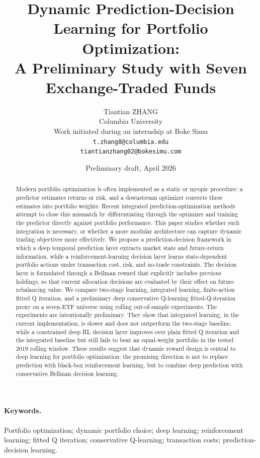 \documentclass[11pt]{article}
\title{Dynamic Prediction-Decision Learning for Portfolio Optimization:\\
A Preliminary Study with Seven Exchange-Traded Funds}
\author{
Tiantian ZHANG\\
Columbia University\\
Work initiated during an internship at Boke Simu\\
\texttt{t.zhang8@columbia.edu}\\
\texttt{tiantianzhang02@bokesimu.com}
}
\date{Preliminary draft, April 2026}
\begin{document}
\maketitle

\begin{abstract}
Modern portfolio optimization is often implemented as a static or myopic procedure: a predictor estimates returns or risk, and a downstream optimizer converts these estimates into portfolio weights. Recent integrated prediction-optimization methods attempt to close this mismatch by differentiating through the optimizer and training the predictor directly against portfolio performance. This paper studies whether such integration is necessary, or whether a more modular architecture can capture dynamic trading objectives more effectively. We propose a prediction-decision framework in which a deep temporal prediction layer extracts market state and future-return information, while a reinforcement-learning decision layer learns state-dependent portfolio actions under transaction cost, risk, and no-trade constraints. The decision layer is formulated through a Bellman reward that explicitly includes previous holdings, so that current allocation decisions are evaluated by their effect on future rebalancing value. We compare two-stage learning, integrated learning, finite-action fitted Q iteration, and a preliminary deep conservative Q-learning fitted-Q-iteration proxy on a seven-ETF universe using rolling out-of-sample experiments. The experiments are intentionally preliminary. They show that integrated learning, in the current implementation, is slower and does not outperform the two-stage baseline, while a constrained deep RL decision layer improves over plain fitted Q iteration and the integrated baseline but still fails to beat an equal-weight portfolio in the tested 2019 rolling window. These results suggest that dynamic reward design is central to deep learning for portfolio optimization: the promising direction is not to replace prediction with black-box reinforcement learning, but to combine deep prediction with conservative Bellman decision learning.
\end{abstract}

\paragraph{Keywords.}
Portfolio optimization; dynamic portfolio choice; deep learning; reinforcement learning; fitted Q iteration; conservative Q-learning; transaction costs; prediction-decision learning.
\end{document}
